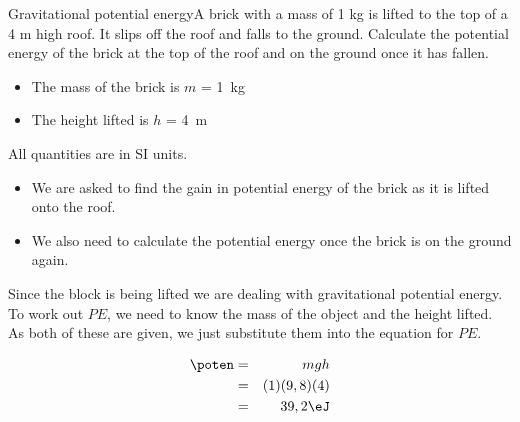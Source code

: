 \begin{wex}{Gravitational potential energy}{A brick with a mass of 1 kg is lifted to the top of a 4 m high roof. It slips off the roof and falls to the ground. Calculate the potential energy of the brick at the top of the roof and on the ground once it has fallen.}
{
\begin{itemize}
\item{The mass of the brick is $m$ = 1~kg}
\item{The height lifted is $h$ = 4~m}
\end{itemize}
All quantities are in SI units.

\begin{itemize}
\item We are asked to find the gain in potential energy of the brick as it is lifted onto the roof.
\item We also need to calculate the potential energy once the brick is on the ground again.
\end{itemize}

Since the block is being lifted we are dealing with gravitational potential energy. To work out $PE$, we need to know the mass of the object and the height lifted. As both of these are given, we just substitute them into the equation for $PE$.

\begin{eqnarray*}
\poten & = & mgh \\
&=& (1)(9,8)(4) \\
&=& 39,2\eJ
\end{eqnarray*}}
\end{wex}

